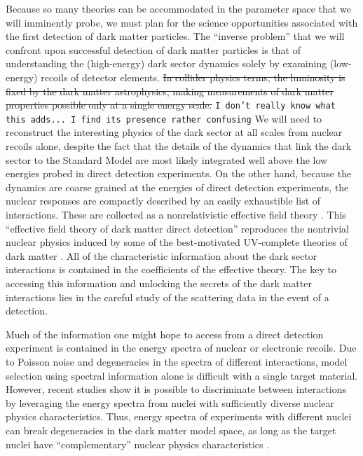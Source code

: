 \documentclass[11pt]{article}
\newcommand{\sjwColor}{red}
\newcommand{\sjwrm}[1]{{\color{\sjwColor}\protect\sout{#1}}}
\newcommand{\sjwtt}[1]{{\color{\sjwColor}\tt #1}}
\begin{document}
Because so many theories can be accommodated in the parameter space that we will imminently probe, we must plan for the science opportunities associated with the first detection of dark matter particles. The ``inverse problem'' that we will confront upon successful detection of dark matter particles is that of understanding the (high-energy) dark sector dynamics solely by examining (low-energy) recoils of detector elements. \sjwrm{In collider physics terms, the luminosity is fixed by the dark matter astrophysics, making measurements of dark matter properties possible only at a single energy scale.} \sjwtt{I don't really know what this adds... I find its presence rather confusing} We will need to reconstruct the interesting physics of the dark sector at all scales from nuclear recoils alone, despite the fact that the details of the dynamics that link the dark sector to the Standard Model are most likely integrated well above the low energies probed in direct detection experiments. On the other hand, because the dynamics are coarse grained at the energies of direct detection experiments, the nuclear responses are compactly described by an easily exhaustible list of interactions. These are collected as a nonrelativistic effective field theory \cite{Fitzpatrick:2012ix, Anand:2013yka}. This ``effective field theory of dark matter direct detection'' reproduces the nontrivial nuclear physics induced by some of the best-motivated UV-complete theories of dark matter \cite{Gresham:2014vja, Gluscevic:2015sqa}. %
All of the characteristic information about the dark sector interactions is contained in the coefficients of the effective theory. The key to accessing this information and unlocking the secrets of the dark matter interactions lies in the careful study of the scattering data in the event of a detection.

Much of the information one might hope to access from a direct detection experiment is contained in the energy spectra of nuclear or electronic recoils. Due to Poisson noise and degeneracies in the spectra of different interactions, model selection using spectral information alone is difficult with a single target material. However, recent studies show it is possible to discriminate between interactions by leveraging the energy spectra from nuclei with sufficiently diverse nuclear physics characteristics. Thus, energy spectra of experiments with different nuclei can break degeneracies in the dark matter model space, as long as the target nuclei have ``complementary'' nuclear physics characteristics \cite{McDermott:2011hx,Peter:2013aha,Gluscevic:2014vga,Catena:2014epa,Catena:2014hla,Dent:2015zpa,Gluscevic:2015sqa,Ruppin:2014bra}.
\end{document}
